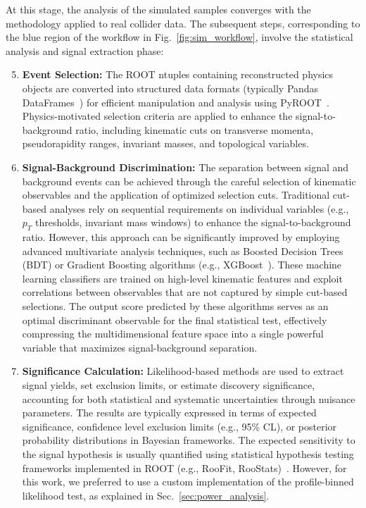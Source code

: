 At this stage, the analysis of the simulated samples converges with the methodology applied to real collider data. The subsequent steps, corresponding to the blue region of the workflow in Fig.~\ref{fig:sim_workflow}, involve the statistical analysis and signal extraction phase:

\begin{enumerate}
    \setcounter{enumi}{4}
    \item \textbf{Event Selection:} The ROOT ntuples containing reconstructed physics objects are converted into structured data formats (typically Pandas DataFrames~\parencite{mckinney2010data}) for efficient manipulation and analysis using PyROOT~\parencite{Brun:1997pa}. Physics-motivated selection criteria are applied to enhance the signal-to-background ratio, including kinematic cuts on transverse momenta, pseudorapidity ranges, invariant masses, and topological variables.

    \item \textbf{Signal-Background Discrimination:} The separation between signal and background events can be achieved through the careful selection of kinematic observables and the application of optimized selection cuts. Traditional cut-based analyses rely on sequential requirements on individual variables (e.g., $p_T$ thresholds, invariant mass windows) to enhance the signal-to-background ratio. However, this approach can be significantly improved by employing advanced multivariate analysis techniques, such as Boosted Decision Trees (BDT) or Gradient Boosting algorithms (e.g., XGBoost~\parencite{chen_xgboost_2016}). These machine learning classifiers are trained on high-level kinematic features and exploit correlations between observables that are not captured by simple cut-based selections. The output score predicted by these algorithms serves as an optimal discriminant observable for the final statistical test, effectively compressing the multidimensional feature space into a single powerful variable that maximizes signal-background separation.

    \item \textbf{Significance Calculation:} Likelihood-based methods are used to extract signal yields, set exclusion limits, or estimate discovery significance, accounting for both statistical and systematic uncertainties through nuisance parameters. The results are typically expressed in terms of expected significance, confidence level exclusion limits (e.g., 95\% CL), or posterior probability distributions in Bayesian frameworks. The expected sensitivity to the signal hypothesis is usually quantified using statistical hypothesis testing frameworks implemented in ROOT (e.g., RooFit, RooStats)~\parencite{Butterworth:2015oua,Moneta:2010pm}. However, for this work, we preferred to use a custom implementation of the profile-binned likelihood test, as explained in Sec.~\ref{sec:power_analysis}.
\end{enumerate}

